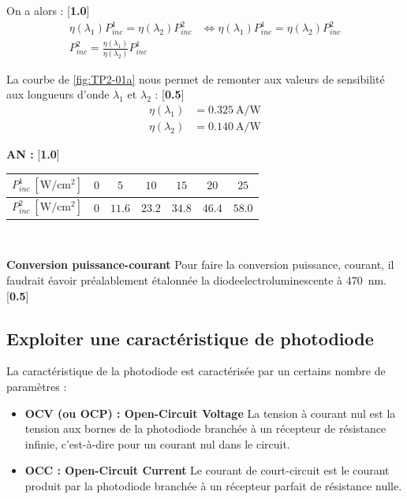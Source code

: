 \documentclass[twoside,a4paper,11pt,addpoints,answers]{exam}%
\newcounter{foo} %
\begin{document}
\begin{questions}
\begin{mybox}
\begin{solution}[5cm]
On a alors : [\textbf{1.0}]
\begin{align*}
\eta ( \lambda_1 ) P_{inc}^1 = \eta ( \lambda_2 ) P_{inc}^2 &\iff \eta ( \lambda_1 ) P_{inc}^1 = \eta ( \lambda_2 ) P_{inc}^2 \\
P_{inc}^2 = \frac{\eta ( \lambda_1 )}{\eta ( \lambda_2 )} P_{inc}^1
\end{align*}

La courbe de \ref{fig:TP2-01a} nous permet de remonter aux valeurs de sensibilité aux longueurs d'onde $\lambda_1$ et $\lambda_2$ : [\textbf{0.5}]
\begin{align*}
\eta ( \lambda_1 ) &= 0.325 ~ \si{\ampere\per\watt} \\
\eta ( \lambda_2 ) &= 0.140 ~ \si{\ampere\per\watt}
\end{align*}

\textbf{AN :} [\textbf{1.0}]

\begin{center}
\begin{tabular}{ccccccc}
\toprule
$P_{inc}^1 ~ [\si{\watt\per\centi\meter\squared}]$ & $0$ & $5$ & $10$  & $15$ & $20$ & $25$ \\
\midrule
$P_{inc}^2 ~ [\si{\watt\per\centi\meter\squared}]$ & $0$ & $11.6$ & $23.2$ & $34.8$ & $46.4$ & $58.0$ \\
\bottomrule
\end{tabular}
\end{center}

~\

\textbf{Conversion puissance-courant} Pour faire la conversion puissance, courant, il faudrait éavoir préalablement étalonnée la diodeelectroluminescente à \SI{470}{\nano\meter}. [\textbf{0.5}]



\end{solution}
\end{mybox}

\setcounter{foo}{\thequestion}
\end{questions}


\subsection{Exploiter une caractéristique de photodiode}

La caractéristique de la photodiode est caractérisée par un certains nombre de paramètres : 

\begin{itemize}
\item \textbf{OCV (ou OCP) : Open-Circuit Voltage} La tension à courant nul est la tension aux bornes de la photodiode branchée à un récepteur de résistance infinie, c'est-à-dire pour un courant nul dans le circuit.
\item \textbf{OCC : Open-Circuit Current} Le courant de court-circuit est le courant produit par la photodiode branchée à un récepteur parfait de résistance nulle.
\end{itemize}
\end{document}
